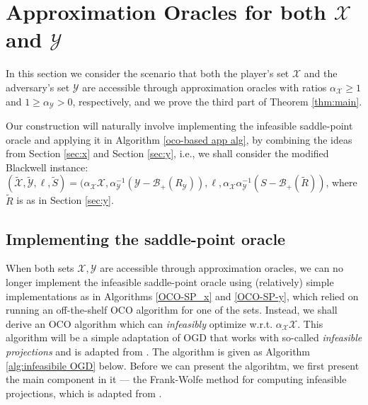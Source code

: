 \documentclass[a4paper,12pt]{article}
\newcommand{\mY}{\mathcal{Y}}
\newcommand{\mX}{\mathcal{X}}
\newcommand{\tY}{\tilde{\mathcal{Y}}}
\newcommand{\tX}{\tilde{\mathcal{X}}}
\newcommand{\tS}{\tilde{S}}
\newcommand{\mB}{\mathcal{B}}
\newcommand{\oracley}{\mathcal{O}_{\mY}}
\begin{document}
\section{Approximation Oracles for both $\mX$ and $\mY$}
In this section we consider the scenario that both the player's set $\mX$ and the adversary's set $\mY$ are accessible through approximation oracles with ratios $\alpha_{\mX} \geq 1$ and $1 \geq \alpha_{\mY} > 0$, respectively, and we prove the third part of Theorem \ref{thm:main}.

Our construction will naturally involve implementing the infeasible saddle-point oracle and applying it in Algorithm \ref{oco-based app  alg}, by combining the ideas from Section \ref{sec:x} and Section \ref{sec:y}, i.e., we shall consider the modified Blackwell instance: $(\tX,\tY,\ell,\tS) = (\alpha_{\mX}\mX, \alpha_{\mY}^{-1}(\mY-\mB_+(R_{\mY})), \ell, \alpha_{\mX}\alpha_{\mY}^{-1}(S-\mB_+(\tilde{R}))$, where $\tilde{R}$ is as in Section \ref{sec:y}.


\subsection{Implementing the saddle-point oracle}
When both sets $\mX,\mY$ are accessible through approximation oracles, we can no longer implement the infeasible saddle-point oracle using (relatively) simple implementations as in Algorithms \ref{OCO-SP_x} and \ref{OCO-SP-y}, which relied on running an off-the-shelf OCO algorithm for one of the sets. Instead, we shall derive an OCO algorithm which can \textit{infeasibly} optimize w.r.t. $\alpha_{\mX}\mX$. This algorithm will be a simple adaptation of OGD that works with so-called \textit{infeasible projections} and is adapted from \cite{garber2017efficient}.  The algorithm is given as Algorithm \ref{alg:infeasibile OGD} below.
Before we can present the algorihtm, we first present the main component in it --- the Frank-Wolfe method for computing infeasible projections, which is adapted from \cite{kakade2007playing}.
\end{document}
